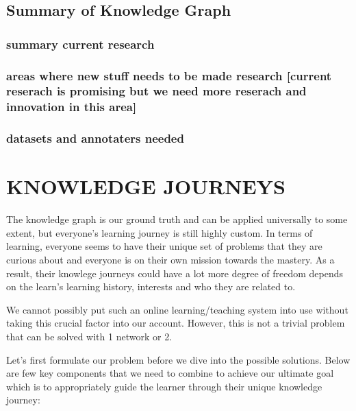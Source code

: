 \documentclass[]{book}
\theoremstyle{definition}
\theoremstyle{definition}
\theoremstyle{definition}
\theoremstyle{remark}
\begin{document}
\section{Summary of Knowledge Graph}\label{summary-of-knowledge-graph}

\subsection{summary current research}\label{summary-current-research-1}

\subsection{areas where new stuff needs to be made research {[}current
reserach is promising but we need more reserach and innovation in this
area{]}}\label{areas-where-new-stuff-needs-to-be-made-research-current-reserach-is-promising-but-we-need-more-reserach-and-innovation-in-this-area-1}

\subsection{datasets and annotaters
needed}\label{datasets-and-annotaters-needed-1}

\chapter{KNOWLEDGE JOURNEYS}\label{knowledge-journeys-1}

The knowledge graph is our ground truth and can be applied universally
to some extent, but everyone's learning journey is still highly custom.
In terms of learning, everyone seems to have their unique set of
problems that they are curious about and everyone is on their own
mission towards the mastery. As a result, their knowlege journeys could
have a lot more degree of freedom depends on the learn's learning
history, interests and who they are related to.

We cannot possibly put such an online learning/teaching system into use
without taking this crucial factor into our account. However, this is
not a trivial problem that can be solved with 1 network or 2.

Let's first formulate our problem before we dive into the possible
solutions. Below are few key components that we need to combine to
achieve our ultimate goal which is to appropriately guide the learner
through their unique knowledge journey:
\end{document}
